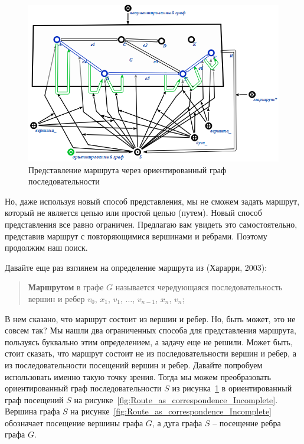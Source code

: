 \begin{figure}
  \centering
  \includegraphics[scale=0.8]{images/2/Route_as_sequence}
  \caption{Представление маршрута через ориентированный граф последовательности}
  \label{fig:Route_as_sequence}
\end{figure}

Но, даже используя новый способ представления, мы не сможем задать
маршрут, который не является цепью или простой цепью (путем). Новый
способ представления все равно ограничен. Предлагаю вам увидеть это
самостоятельно, представив маршрут с повторяющимися вершинами и
ребрами. Поэтому продолжим наш поиск.

Давайте еще раз взглянем на определение маршрута из (Харарри, 2003):

\begin{quotation}
  \textbf{Маршрутом} в графе $G$ называется чередующаяся
  последовательность вершин и ребер $v_0$, $x_1$, $v_1$, $\dotsc$, $v_{n-1}$,
  $x_n$, $v_n$;
\end{quotation}

В нем сказано, что маршрут состоит из вершин и ребер. Но, быть может,
это не совсем так? Мы нашли два ограниченных способа для представления
маршрута, пользуясь буквально этим определением, а задачу еще не
решили. Может быть, стоит сказать, что маршрут состоит не из
последовательности вершин и ребер, а из последовательности посещений
вершин и ребер. Давайте попробуем использовать именно такую точку
зрения. Тогда мы можем преобразовать ориентированный граф
последовательности $S$ из рисунка~\ref{fig:Route_as_sequence} в
ориентированный граф посещений $S$ на
рисунке~\ref{fig:Route_as_correspondence_Incomplete}. Вершина графа
$S$ на рисунке~\ref{fig:Route_as_correspondence_Incomplete} обозначает
посещение вершины графа $G$, а дуга графа $S$ – посещение ребра графа
$G$.

